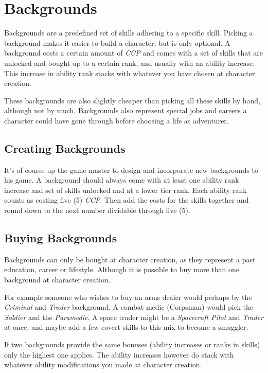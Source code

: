 \chapter{Backgrounds}
\label{chap:Backgrounds}

Backgrounds are a predefined set of skills adhering to a specific skill.
Picking a background makes it easier to build a character, but is only
optional. A background costs a certain amount of \emph{CCP} and comes with
a set of skills that are unlocked and bought up to a certain rank, and
usually with an ability increase. This increase in ability rank stacks
with whatever you have chosen at character creation.

These backgrounds are also slightly cheaper than picking all these skills
by hand, although not by much. Backgrounds also represent special jobs and
careers a character could have gone through before choosing a life as
adventurer.

\section{Creating Backgrounds}
\label{sec:5-Creating Backgrounds}

It's of course up the game master to design and incorporate new backgrounds
to his game. A background should always come with at least one ability rank
increase and set of skills unlocked and at a lower tier rank. Each ability
rank counts as costing five (5) \emph{CCP}. Then add the costs for the skills
together and round down to the next number dividable through five (5).

\section{Buying Backgrounds}
\label{sec:5-Buying Backgrounds}

Backgrounds can only be bought at character creation, as they represent a
past education, career or lifestyle. Although it is possible to buy more than
one background at character creation.

For example someone who wishes to buy an arms dealer would perhaps by the
\emph{Criminal} and \emph{Trader} background. A combat medic (Corpsman) would
pick the \emph{Soldier} and the \emph{Paramedic}. A space trader might be a
\emph{Spacecraft Pilot} and \emph{Trader} at once, and maybe add a few covert
skills to this mix to become a smuggler.

If two backgrounds provide the same bonuses (ability increases or ranks in
skills) only the highest one applies. The ability increases however do stack
with whatever ability modifications you made at character creation.

